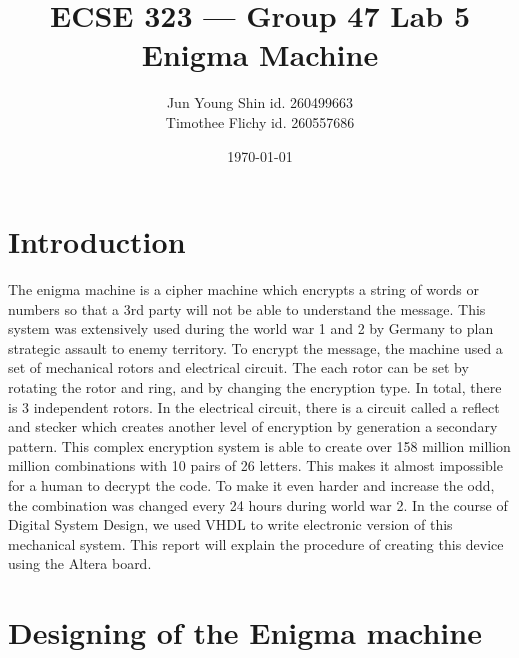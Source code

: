 \documentclass[10pt]{article}
\title{ECSE 323 --- Group 47 Lab 5 Enigma Machine}
\author{Jun Young Shin id. 260499663\\ Timothee Flichy id. 260557686}
\date{\today}
\begin{document}
\maketitle
\section{Introduction}
The enigma machine is a cipher machine which encrypts a string of words or numbers so that a 3rd party will not be able to understand the message. This system was extensively used during the world war 1 and 2 by Germany to plan strategic assault to enemy territory. To encrypt the message, the machine used a set of mechanical rotors and electrical circuit. The each rotor can be set by rotating the rotor and ring, and by changing the encryption type. In total, there is 3 independent rotors. In the electrical circuit, there is a circuit called a reflect and stecker which creates another level of encryption by generation a secondary pattern. This complex encryption system is able to create over 158 million million million combinations with 10 pairs of 26 letters. This makes it almost impossible for a human to decrypt the code. To make it even harder and increase the odd, the combination was changed every 24 hours during world war 2. In the course of Digital System Design, we used VHDL to write electronic version of this mechanical system. This report will explain the procedure of creating this device using the Altera board.

\section{Designing of the Enigma machine}

\end{document}
